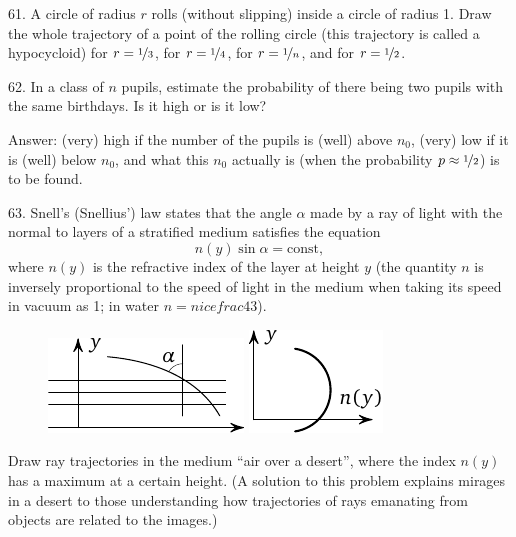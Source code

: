 \begin{problem}{61.}
	A circle of radius $r$ rolls (without slipping) inside a circle of radius 1.
	Draw the whole trajectory of a point of the rolling circle (this trajectory is called a hypocycloid)
	for $r=\nicefrac{1}{3}$, for $r=\nicefrac{1}{4}$, for $r=\nicefrac{1}{n}$, and for $r=\nicefrac{1}{2}$.
\end{problem}

\begin{problem}{62.}
	In a class of $n$ pupils, estimate the probability of there being two pupils with the same birthdays. Is it high or is it low?

	\begin{note}{Answer:}
		(very) high if the number of the pupils is (well) above $n_0$,
		(very) low if it is (well) below $n_0$, and what this $n_0$ actually is
		(when the probability $p \approx \nicefrac{1}{2}$) is to be found.
	\end{note}
\end{problem}

\begin{problem}{63.}
	Snell's (Snellius') law states that the angle $\alpha$ made by a ray of light with the normal to layers of a stratified medium satisfies the equation
	\begin{equation*}
		n(y) \sin \alpha=\text{const},
	\end{equation*}
	where $n(y)$ is the refractive index of the layer at height $y$ (the quantity $n$ is	inversely proportional to the speed
	of light in the medium when taking its speed in vacuum as 1; in water $n=nicefrac{4}{3}$).
	\begin{figure}
		\null\hfill
		\includegraphics{resources/taskbook-47}
		\hfill
		\includegraphics{resources/taskbook-471}
		\hfill\null
	\end{figure}

	Draw ray trajectories in the medium  \enquote{air over a desert}, where the index $n(y)$ has a maximum
	at a certain height.
	(A solution to this problem explains mirages in a desert to those understanding how trajectories of rays emanating from objects are related to the images.)
\end{problem}

